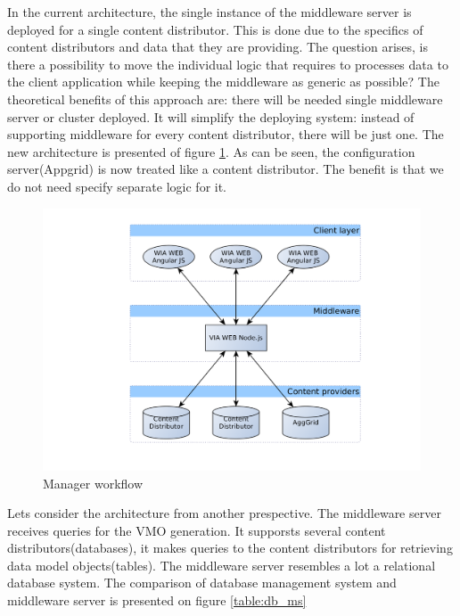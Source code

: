 In the current architecture, the single instance of the middleware server is deployed for a single content distributor. This is done due to the specifics of content distributors and data that they are providing. The question arises, is there a possibility to move the individual logic that requires to processes data to the client application while keeping the middleware as generic as possible? The theoretical benefits of this approach are: there will be needed single middleware server or cluster deployed. It will simplify the deploying system: instead of supporting middleware for every content distributor, there will be just one. The new architecture is presented of figure \ref{fig:arch_overview_new}. As can be seen, the configuration server(Appgrid) is now treated like a content distributor. The benefit is that we do not need specify separate logic for it. 

\begin{figure}[h]
    \centering
	\includegraphics[width=\textwidth]{images/thesis_global_architecture_new.png}
    \caption{Manager workflow}
    \label{fig:arch_overview_new}
\end{figure}

Lets consider the architecture from another prespective.
The middleware server receives queries for the VMO generation. It supporsts several content distributors(databases), it makes queries to the content distributors for retrieving data model objects(tables). The middleware server resembles a lot a relational database system. The comparison of database management system and middleware server is presented on figure \ref{table:db_ms}

